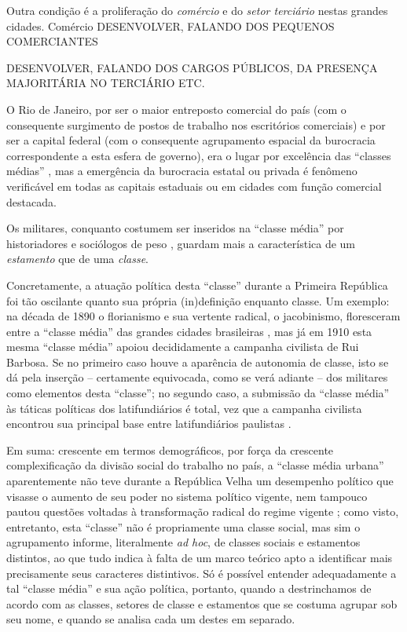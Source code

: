 Outra condição é a proliferação do \textit{comércio} e do \textit{setor terciário} nestas grandes cidades.  Comércio DESENVOLVER, FALANDO DOS PEQUENOS COMERCIANTES

DESENVOLVER, FALANDO DOS CARGOS PÚBLICOS, DA PRESENÇA MAJORITÁRIA NO TERCIÁRIO ETC.

O Rio de Janeiro, por ser o maior entreposto comercial do país (com o consequente surgimento de postos de trabalho nos escritórios comerciais) e por ser a capital federal (com o consequente agrupamento espacial da burocracia correspondente a esta esfera de governo), era o lugar por excelência das ``classes médias'' \cite[p.~119]{pinheiro_clamed_1977}, mas a emergência da burocracia estatal ou privada é fenômeno verificável em todas as capitais estaduais ou em cidades com função comercial destacada. 

Os militares, conquanto costumem ser inseridos na ``classe média'' por historiadores e sociólogos de peso \cite{}, guardam mais a característica de um \textit{estamento} que de uma \textit{classe}.

Concretamente, a atuação política desta ``classe'' durante a Primeira República foi tão oscilante quanto sua própria (in)definição enquanto classe. Um exemplo: na década de 1890 o florianismo e sua vertente radical, o jacobinismo, floresceram entre a ``classe média'' das grandes cidades brasileiras \cite{queiroz_radicais_1986}, mas já em 1910 esta mesma ``classe média'' apoiou decididamente a campanha civilista de Rui Barbosa. Se no primeiro caso houve a aparência de autonomia de classe, isto se dá pela inserção -- certamente equivocada, como se verá adiante -- dos militares como elementos desta ``classe''; no segundo caso, a submissão da ``classe média'' às táticas políticas dos latifundiários é total, vez que a campanha civilista encontrou sua principal base entre latifundiários paulistas \cite[p.~28-29]{pinheiro_clamed_1977}.

Em suma: crescente em termos demográficos, por força da crescente complexificação da divisão social do trabalho no país, a ``classe média urbana'' aparentemente não teve durante a República Velha um desempenho político que visasse o aumento de seu poder no sistema político vigente, nem tampouco pautou questões voltadas à transformação radical do regime vigente \cite[p.~36]{pinheiro_clamed_1977}; como visto, entretanto, esta ``classe'' não é propriamente uma classe social, mas sim o agrupamento informe, literalmente \textit{ad hoc}, de classes sociais e estamentos distintos, ao que tudo indica à falta de um marco teórico apto a identificar mais precisamente seus caracteres distintivos. Só é possível entender adequadamente a tal ``classe média'' e sua ação política, portanto, quando a destrinchamos de acordo com as classes, setores de classe e estamentos que se costuma agrupar sob seu nome, e quando se analisa cada um destes em separado.

